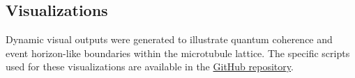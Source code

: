 \subsection{Visualizations}
Dynamic visual outputs were generated to illustrate quantum coherence and event horizon-like boundaries within the microtubule lattice. The specific scripts used for these visualizations are available in the \href{https://github.com/TheonlyqueenAC/Microtubule_Simulation}{GitHub repository}.